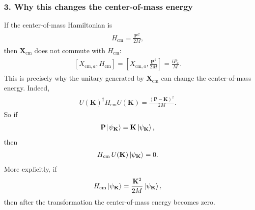 \documentclass[../QFT_main.tex]{subfiles}
\begin{document}
\subsubsection*{3. Why this changes the center-of-mass energy}
If the center-of-mass Hamiltonian is
{\small\begin{align}
\begin{aligned}
    H_{\text{cm}}=\frac{\mathbf{P}^2}{2M},
\end{aligned}
\end{align}}
then $\mathbf{X}_{\text{cm}}$ does not commute with $H_{\text{cm}}$:
{\small\begin{align}
\begin{aligned}
    [X_{\text{cm},a},H_{\text{cm}}]=\left[X_{\text{cm},a},\frac{\mathbf{P}^2}{2M}\right]=\frac{iP_a}{M}.
\end{aligned}
\end{align}}
This is precisely why the unitary generated by $\mathbf{X}_{\text{cm}}$ can change the center-of-mass energy.
Indeed,
{\small\begin{align}
\begin{aligned}
    U(\mathbf{K})^\dagger H_{\text{cm}}U(\mathbf{K})=\frac{(\mathbf{P}-\mathbf{K})^2}{2M}.
\end{aligned}
\end{align}}
So if
{\small\begin{align}
\begin{aligned}
    \mathbf{P}\ket{\psi_{\mathbf{K}}}=\mathbf{K}\ket{\psi_{\mathbf{K}}},
\end{aligned}
\end{align}}
then
{\small\begin{align}
\begin{aligned}
    H_{\text{cm}}\,U(\mathbf{K})\ket{\psi_{\mathbf{K}}}=0.
\end{aligned}
\end{align}}
More explicitly, if
{\small\begin{align}
\begin{aligned}
    H_{\text{cm}}\ket{\psi_{\mathbf{K}}}=\frac{\mathbf{K}^2}{2M}\ket{\psi_{\mathbf{K}}},
\end{aligned}
\end{align}}
then after the transformation the center-of-mass energy becomes zero.
\end{document}
